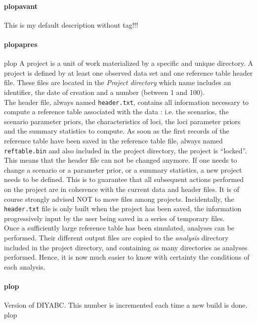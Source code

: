 \documentclass[12pt,a4paper]{article}
\begin{document}
        \paragraph{plopavant}
        \label{doc_versionLabel}
        This is my default description without tag!!!

        \paragraph{plopapres}
        plop
        \label{doc_openProjectButton}
        A project is a unit of work materialized by a specific and unique directory. A project is defined by at least one observed data set and one reference table header file. These files are located in the \emph{Project directory} which name includes an identifier, the date of creation and a number (between 1 and 100).\\

        The header file, always named \texttt{header.txt}, contains all information necessary to compute a reference table associated with the data : i.e. the scenarios, the scenario parameter priors, the characteristics of loci, the loci parameter priors and the summary statistics to compute.
        As soon as the first records of the reference table have been saved in the reference table file,  always named \texttt{reftable.bin} and also included in the project directory, the project is ``locked''. This means that the header file can not be changed anymore. If one needs to change a scenario or a parameter prior, or a summary statistics, a new project needs to be defined. This is to guarantee that all subsequent actions performed on the project are in coherence with the current data and header files. It is of course strongly advised NOT to move files among projects.
        Incidentally, the \texttt{header.txt} file is only built when the project has been saved, the information progressively input by the user being saved in a series of temporary files.\\

        Once a sufficiently large reference table has been simulated, analyses can be performed. Their different output files are copied to the \emph{analysis} directory included in the project directory, and containing as many directories as analyses performed. Hence, it is now much easier to know with certainty the conditions of each analysis.    


        \paragraph{plop}
        \label{doc_versionLabel+++plop+++plap}
        Version of DIYABC. This number is incremented each time a new build is done.
        plop
\end{document}
